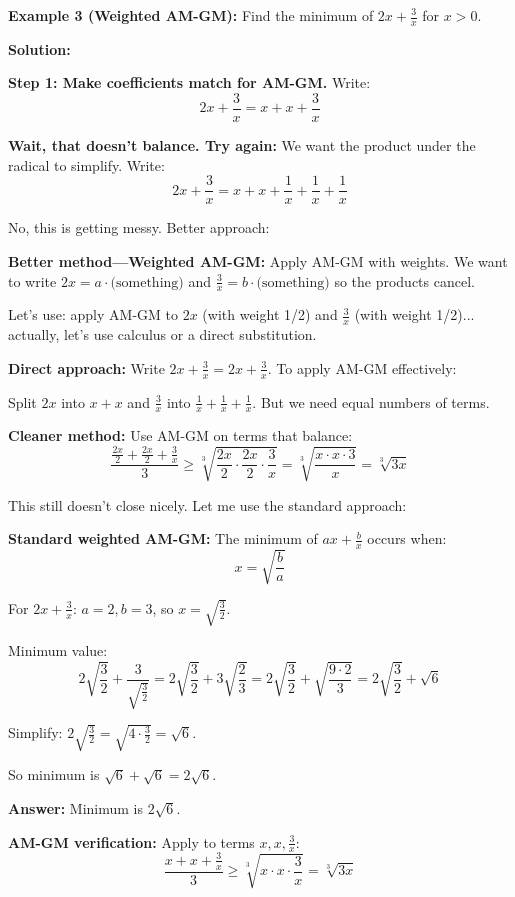 \documentclass[12pt]{extarticle}
\begin{document}
\begin{examplebox}
\textbf{Example 3 (Weighted AM-GM):} Find the minimum of $2x + \frac{3}{x}$ for $x > 0$.

\textbf{Solution:}

\textbf{Step 1: Make coefficients match for AM-GM.} Write:
\[
2x + \frac{3}{x} = x + x + \frac{3}{x}
\]

\textbf{Wait, that doesn't balance. Try again:} We want the product under the radical to simplify. Write:
\[
2x + \frac{3}{x} = x + x + \frac{1}{x} + \frac{1}{x} + \frac{1}{x}
\]

No, this is getting messy. Better approach:

\textbf{Better method—Weighted AM-GM:} Apply AM-GM with weights. We want to write $2x = a \cdot \text{(something)}$ and $\frac{3}{x} = b \cdot \text{(something)}$ so the products cancel.

Let's use: apply AM-GM to $2x$ (with weight 1/2) and $\frac{3}{x}$ (with weight 1/2)... actually, let's use calculus or a direct substitution.

\textbf{Direct approach:} Write $2x + \frac{3}{x} = 2x + \frac{3}{x}$. To apply AM-GM effectively:

Split $2x$ into $x + x$ and $\frac{3}{x}$ into $\frac{1}{x} + \frac{1}{x} + \frac{1}{x}$. But we need equal numbers of terms.

\textbf{Cleaner method:} Use AM-GM on terms that balance:
\[
\frac{\frac{2x}{2} + \frac{2x}{2} + \frac{3}{x}}{3} \ge \sqrt[3]{\frac{2x}{2} \cdot \frac{2x}{2} \cdot \frac{3}{x}} = \sqrt[3]{\frac{x \cdot x \cdot 3}{x}} = \sqrt[3]{3x}
\]

This still doesn't close nicely. Let me use the standard approach:

\textbf{Standard weighted AM-GM:} The minimum of $ax + \frac{b}{x}$ occurs when:
\[
x = \sqrt{\frac{b}{a}}
\]

For $2x + \frac{3}{x}$: $a=2, b=3$, so $x = \sqrt{\frac{3}{2}}$.

Minimum value:
\[
2\sqrt{\frac{3}{2}} + \frac{3}{\sqrt{\frac{3}{2}}} = 2\sqrt{\frac{3}{2}} + 3\sqrt{\frac{2}{3}} = 2\sqrt{\frac{3}{2}} + \sqrt{\frac{9 \cdot 2}{3}} = 2\sqrt{\frac{3}{2}} + \sqrt{6}
\]

Simplify: $2\sqrt{\frac{3}{2}} = \sqrt{4 \cdot \frac{3}{2}} = \sqrt{6}$.

So minimum is $\sqrt{6} + \sqrt{6} = 2\sqrt{6}$.

\textbf{Answer:} Minimum is $\boxed{2\sqrt{6}}$.

\textbf{AM-GM verification:} Apply to terms $x, x, \frac{3}{x}$:
\[
\frac{x + x + \frac{3}{x}}{3} \ge \sqrt[3]{x \cdot x \cdot \frac{3}{x}} = \sqrt[3]{3x}
\]


\end{examplebox}
\end{document}
